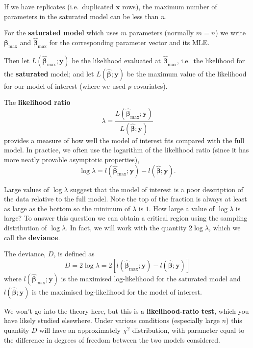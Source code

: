 \documentclass[
  a4paper,
  DIV=11,
  numbers=noendperiod]{scrreprt}
\newcommand{\term}[1]{\textbf{#1}}
\newenvironment{fbxSimple}[3]{\begin{tcolorbox}[enhanced, breakable,%
attach boxed title to top*={xshift=1.4pt},
boxed title style={boxrule=0.0mm, fuzzy shadow={1pt}{-1pt}{0mm}{0.1mm}{gray}, arc=.3em, rounded corners=east, sharp corners=west}, colframe=#1-color2, colbacktitle=#1-color1, colback = white, coltitle=black,  titlerule=0mm, toprule=0pt, bottomrule=.7pt, leftrule=.3em, rightrule=.7pt, outer arc=.3em,  	left=.5em, right=.5em, bottomtitle=1mm, toptitle=1mm,title=\textbf{#2}\hspace{0.5em}{#3}]}
{\end{tcolorbox}}
\begin{document}
If we have replicates (i.e.~duplicated \(\boldsymbol{x}\) rows), the
maximum number of parameters in the saturated model can be less than
\(n\).

For the \term{saturated model} which uses \(m\) parameters (normally
\(m=n\)) we write \(\boldsymbol{\beta}_{\max}\) and
\(\hat{\boldsymbol{\beta}}_{\max}\) for the corresponding parameter
vector and its MLE.

Then let \(L(\hat{\boldsymbol{\beta}}_{\max};\boldsymbol{y})\) be the
likelihood evaluated at \(\hat{\boldsymbol{\beta}}_{\max}\), i.e.~the
likelihood for the \term{saturated} model; and let
\(L(\hat{\boldsymbol{\beta}};\boldsymbol{y})\) be the maximum value of
the likelihood for our model of interest (where we used \(p\)
covariates).

The \term{likelihood ratio} \[
\lambda=\frac{L(\hat{\boldsymbol{\beta}}_{\max};\boldsymbol{y})}{L(\hat{\boldsymbol{\beta}};\boldsymbol{y})}
\] provides a measure of how well the model of interest fits compared
with the full model. In practice, we often use the logarithm of the
likelihood ratio (since it has more neatly provable asymptotic
properties), \[
\log \lambda = l(\hat{\boldsymbol{\beta}}_{\max};\boldsymbol{y})-l(\hat{\boldsymbol{\beta}};\boldsymbol{y}).
\]

Large values of \(\log \lambda\) suggest that the model of interest is a
poor description of the data relative to the full model. Note the top of
the fraction is always at least as large as the bottom so the minimum of
\(\lambda\) is \(1\). How large a value of \(\log \lambda\) is large? To
answer this question we can obtain a critical region using the sampling
distribution of \(\log \lambda\). In fact, we will work with the
quantity \(2\log \lambda\), which we call the \term{deviance}.

\label{deviance-1}
\begin{fbxSimple}{Definition}{Definition 6: }{Deviance}
\label{deviance-1}
The deviance, \(D\), is defined as \[
D=2\log \lambda =2\left[ l(\hat{\boldsymbol{\beta}}_{\max};\boldsymbol{y})-l(\hat{\boldsymbol{\beta}};\boldsymbol{y})\right]
\] where \(l(\hat{\boldsymbol{\beta}}_{\max};\boldsymbol{y})\) is the
maximised log-likelihood for the saturated model and
\(l(\hat{\boldsymbol{\beta}};\boldsymbol{y})\) is the maximised
log-likelihood for the model of interest.

\end{fbxSimple}

We won't go into the theory here, but this is a \term{likelihood-ratio
test}, which you have likely studied elsewhere. Under various conditions
(especially large \(n\)) this quantity \(D\) will have an approximately
\(\chi^2\) distribution, with parameter equal to the difference in
degrees of freedom between the two models considered.
\end{document}
